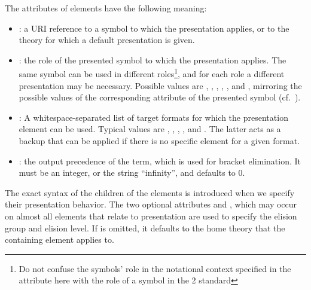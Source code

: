 \documentclass[a4paper]{article}
\begin{document}
The attributes of {} elements have the following meaning:
\begin{itemize}
\item {}: a URI reference to a symbol to which the
  presentation applies, or to the theory for which a default presentation is given.
\item {}: the role of the presented symbol to which the
  presentation applies. The same symbol can be used in different roles\footnote{Do not
    confuse the symbols' role in the notational context specified in the
    {} attribute here with the role of a symbol in the
    {\openmath}2 standard}, and for each role a different presentation may be necessary.
  Possible values are {},
  {}, {},
  {}, {}, and
  {}, mirroring the possible values of the corresponding
  attribute of the presented symbol (cf.~\cite[chapter~15.2.1]{Kohlhase:omdoc1.2}).
\item {}: A whitespace-separated list of target formats
  for which the presentation element can be used. Typical values are
  {}, {},
  {}, {}, and
  {}. The latter acts as a backup that can be applied
  if there is no specific {} element for a given format.
\item {}: the output precedence of the term, which is
  used for bracket elimination. It must be an integer, or the string ``infinity'', and
  defaults to $0$.\ednote{IMHO reicht $[0,\infty)$; $(-\infty,+\infty)$ braucht man nicht.
    --CL}
\end{itemize} 
The exact syntax of the children of the {} elements is introduced
when we specify their presentation behavior. The two optional attributes
{} and {}, which may occur on almost all
elements that relate to presentation are used to specify the elision group and elision
level. If {} is omitted, it defaults to the home theory that the
containing {} element applies to.
\end{document}
